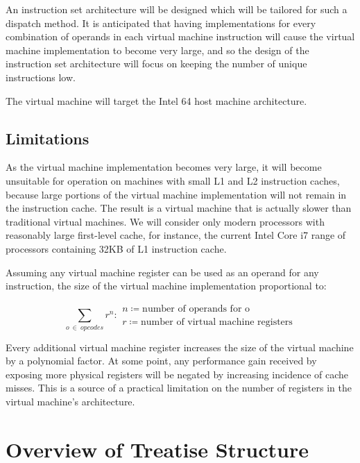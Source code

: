 		An instruction set architecture will be designed which will be tailored for such a dispatch method. It is anticipated that having implementations for every combination of operands in each virtual machine instruction will cause the virtual machine implementation to become very large, and so the design of the instruction set architecture will focus on keeping the number of unique instructions low.
		
		The virtual machine will target the Intel 64 host machine architecture.
		
		\subsection{Limitations}
			As the virtual machine implementation becomes very large, it will become unsuitable for operation on machines with small L1 and L2 instruction caches, because large portions of the virtual machine implementation will not remain in the instruction cache. The result is a virtual machine that is actually slower than traditional virtual machines. We will consider only modern processors with reasonably large first-level cache, for instance, the current Intel Core i7 range of processors containing 32KB of L1 instruction cache.
			
			Assuming any virtual machine register can be used as an operand for any instruction, the size of the virtual machine implementation proportional to:
			
			\[
				\sum_{o~\in~opcodes} r^n : 
					\begin{array}{l}
						n \coloneqq \text{number of operands for o} \\
						r \coloneqq \text{number of virtual machine registers}
					\end{array}
			\] 
			
			Every additional virtual machine register increases the size of the virtual machine by a polynomial factor. At some point, any performance gain received by exposing more physical registers will be negated by increasing incidence of cache misses. This is a source of a practical limitation on the number of registers in the virtual machine's architecture.
			
				
	\section{Overview of Treatise Structure}

